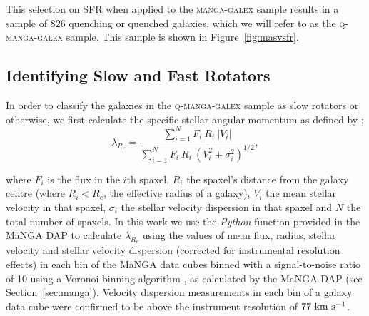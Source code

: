 \documentclass[useAMS,usenatbib]{mn2e}
\begin{document}
This selection on SFR when applied to the \textsc{manga-galex} sample results in a sample of $826$ quenching or quenched galaxies, which we will refer to as the \textsc{q-manga-galex} sample. This sample is shown in Figure~\ref{fig:masvsfr}.


\subsection{Identifying Slow and Fast Rotators}

In order to classify the galaxies in the \textsc{q-manga-galex} sample as slow rotators or otherwise, we first calculate the specific stellar angular momentum as defined by \cite{emsellem07, emsellem11};
\begin{equation}
\lambda_{R_{e}} = \frac{\sum_{i=1}^{N} F_i\ R_i\ |V_i|}{\sum_{i=1}^{N} F_i\ R_i\ (V_i^2 + \sigma_i^2)^{1/2}},
\end{equation}	

where $F_i$ is the flux in the $i$th spaxel, $R_i$ the spaxel's distance from the galaxy centre (where $R_i < R_e$, the effective radius of a galaxy), $V_i$ the mean stellar velocity in that spaxel, $\sigma_i$ the stellar velocity dispersion in that spaxel and $N$ the total number of spaxels. In this work we use the \emph{Python} function provided in the MaNGA DAP to calculate $\lambda_{R_{e}}$ using the values of mean flux, radius, stellar velocity and stellar velocity dispersion (corrected for instrumental resolution effects) in each bin of the MaNGA data cubes binned with a signal-to-noise ratio of 10 using a Voronoi binning algorithm \citep{cappellari03}, as calculated by the MaNGA DAP (see Section~\ref{sec:manga}). Velocity dispersion measurements in each bin of a galaxy data cube were confirmed to be above the instrument resolution of $77~\rm{km}~\rm{s}^{-1}$.
\end{document}
